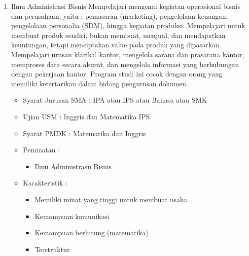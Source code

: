 \documentclass[a4paper,twoside]{article}
\begin{document}
\begin{enumerate}
\begin{enumerate}
\begin{enumerate}
				\item Ilmu Administrasi Bisnis
					Mempelajari mengenai kegiatan operasional bisnis dan perusahaan, yaitu : pemasaran (marketing), pengelolaan keuangan, pengelolaan personalia (SDM), hingga kegiatan produksi. Mempelajari untuk membuat produk sendiri, bukan membuat, menjual, dan mendapatkan keuntungan, tetapi menciptakan value pada produk yang dipasarkan.  Mempelajari urusan klarikal kantor, mengelola sarana dan prasarana kantor, memproses data secara akurat, dan mengelola informasi yang berhubungan dengan pekerjaan kantor. Program studi ini cocok dengan orang yang memiliki ketertarikan dalam bidang pengurusan dokumen.
					\begin{itemize}
						\item Syarat Jurusan SMA : IPA atau IPS atau Bahasa atau SMK
						\item Ujian USM : Inggris dan Matematika IPS
						\item Syarat PMDK : Matematika dan Inggris
						\item Peminatan :
						\begin{itemize}
							\item Ilmu Administrasu Bisnis
						\end{itemize}
						\item Karakteristik :
						\begin{itemize}
							\item Memiliki minat yang tinggi untuk membuat usaha
							\item Kemampuan komunikasi
							\item Kemampuan berhitung (matematika)
							\item Terstruktur
						\end{itemize}
					\end{itemize}
					

\end{enumerate}
\end{enumerate}
\end{enumerate}
\end{document}
